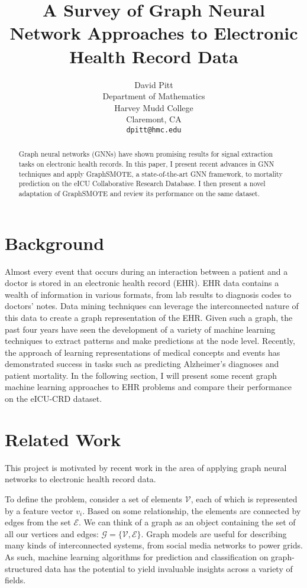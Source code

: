 \documentclass{article}
\title{A Survey of Graph Neural Network Approaches to Electronic Health Record Data}
\author{%
  David Pitt \\ %
  Department of Mathematics\\
  Harvey Mudd College\\
  Claremont, CA \\
  \texttt{dpitt@hmc.edu} \\
}
\begin{document}

\maketitle

\begin{abstract}
  Graph neural networks (GNNs) have shown promising results for signal extraction tasks on electronic health records. In this paper, I present recent advances in GNN techniques and apply GraphSMOTE, a state-of-the-art GNN framework, to mortality prediction on the eICU Collaborative Research Database. I then present a novel adaptation of GraphSMOTE and review its performance on the same dataset.
\end{abstract}


\section{Background}

	Almost every event that occurs during an interaction between a patient and a doctor is stored in an electronic health record (EHR). EHR data contains a wealth of information in various formats, from lab results to diagnosis codes to doctors' notes. Data mining techniques can leverage the interconnected nature of this data to create a graph representation of the EHR. Given such a graph, the past four years have seen the development of a variety of machine learning techniques to extract patterns and make predictions at the node level. Recently, the approach of learning representations of medical concepts and events has demonstrated success in tasks such as predicting Alzheimer's diagnoses and patient mortality. In the following section, I will present some recent graph machine learning approaches to EHR problems and compare their performance on the eICU-CRD dataset.


\section{Related Work}

This project is motivated by recent work in the area of applying graph neural networks to electronic health record data.

To define the problem, consider a set of elements $\mathcal{V}$, each of which is represented by a feature vector $v_i$. Based on some relationship, the elements are connected by edges from the set $\mathcal{E}$. We can think of a graph as an object containing the set of all our vertices and edges: $\mathcal{G} = \{\mathcal{V},\mathcal{E}\}$. Graph models are useful for describing many kinds of interconnected systems, from social media networks to power grids. As such, machine learning algorithms for prediction and classification on graph-structured data has the potential to yield invaluable insights across a variety of fields. 
\end{document}
